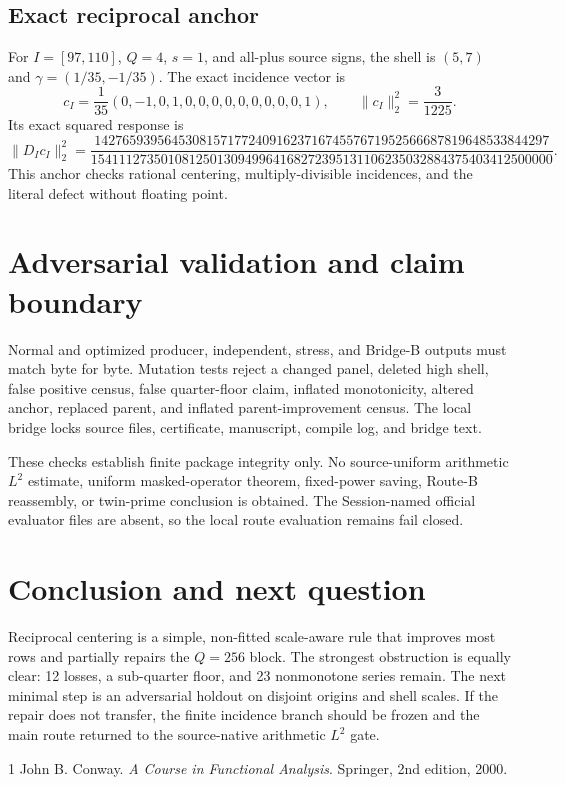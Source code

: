 \documentclass[10pt]{article}
\begin{document}
\subsection{Exact reciprocal anchor}

For $I=[97,110]$, $Q=4$, $s=1$, and all-plus source signs, the shell is
$(5,7)$ and $\gamma=(1/35,-1/35)$.  The exact incidence vector is
\[
 c_I=\frac1{35}(0,-1,0,1,0,0,0,0,0,0,0,0,0,1),
 \qquad \|c_I\|_2^2=\frac3{1225}.
\]
Its exact squared response is
\[
 \|D_Ic_I\|_2^2=
 \frac{14276593956453081571772409162371674557671952566687819648533844297}
 {154111273501081250130949964168272395131106235032884375403412500000}.
\]
This anchor checks rational centering, multiply-divisible incidences, and the
literal defect without floating point.

\section{Adversarial validation and claim boundary}

Normal and optimized producer, independent, stress, and Bridge-B outputs must
match byte for byte.  Mutation tests reject a changed panel, deleted high
shell, false positive census, false quarter-floor claim, inflated monotonicity,
altered anchor, replaced parent, and inflated parent-improvement census.  The
local bridge locks source files, certificate, manuscript, compile log, and
bridge text.

These checks establish finite package integrity only.  No source-uniform
arithmetic $L^2$ estimate, uniform masked-operator theorem, fixed-power saving,
Route-B reassembly, or twin-prime conclusion is obtained.  The Session-named
official evaluator files are absent, so the local route evaluation remains
fail closed.

\section{Conclusion and next question}

Reciprocal centering is a simple, non-fitted scale-aware rule that improves
most rows and partially repairs the $Q=256$ block.  The strongest obstruction
is equally clear: 12 losses, a sub-quarter floor, and 23 nonmonotone series
remain.  The next minimal step is an adversarial holdout on disjoint origins
and shell scales.  If the repair does not transfer, the finite incidence branch
should be frozen and the main route returned to the source-native arithmetic
$L^2$ gate.

\begin{thebibliography}{1}
John B. Conway. \emph{A Course in Functional Analysis}. Springer, 2nd edition,
2000.
\end{thebibliography}
\end{document}
